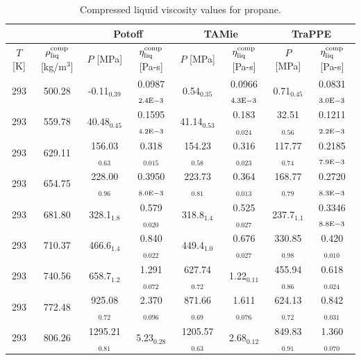 \documentclass[preprint,review,12pt]{elsarticle}
\begin{document}
	\begin{table}[H]
		\caption{Compressed liquid viscosity values for propane.}
		\begin{center}
			\begin{tabular}{|c|c|c|c|c|c|c|c|}
				\hline
				            &                  & \multicolumn{2}{c|}{Potoff}     & \multicolumn{2}{c|}{TAMie}      & \multicolumn{2}{c|}{TraPPE}    \\ \hline
				$T$ {[}K{]} & $\rho^{\rm comp}_{\rm liq}$ {[}kg/m$^3${]} & $P$ {[}MPa{]}    & $\eta^{\rm comp}_{\rm liq}$ {[}Pa-s{]} & $P$ {[}MPa{]}    & $\eta^{\rm comp}_{\rm liq}$ {[}Pa-s{]} & $P$ {[}MPa{]}   & $\eta^{\rm comp}_{\rm liq}$ {[}Pa-s{]} \\ \hline
				293         & 500.28           & -0.11$_{0.39}$   & 0.0987$_{2.4 \rm E-3}$ & 0.54$_{0.35}$    & 0.0966$_{4.3 \rm E-3}$ & 0.71$_{0.45}$   & 0.0831$_{3.0 \rm E-3}$ \\ \hline
				293         & 559.78           & 40.48$_{0.45}$   & 0.1595$_{4.2 \rm E-3}$ & 41.14$_{0.53}$   & 0.183$_{0.024}$   & 32.51$_{0.56}$  & 0.1211$_{2.2 \rm E-3}$ \\ \hline
				293         & 629.11           & 156.03$_{0.63}$  & 0.318$_{0.015}$   & 154.23$_{0.58}$  & 0.316$_{0.023}$   & 117.77$_{0.74}$ & 0.2185$_{7.9 \rm E-3}$ \\ \hline
				293         & 654.75           & 228.00$_{0.96}$  & 0.3950$_{8.0 \rm E-3}$ & 223.73$_{0.81}$  & 0.364$_{0.013}$   & 168.77$_{0.79}$ & 0.2720$_{8.3 \rm E-3}$ \\ \hline
			    293         & 681.80           & 328.1$_{1.8}$    & 0.579$_{0.020}$   & 318.8$_{1.4}$    & 0.525$_{0.027}$   & 237.7$_{1.1}$   & 0.3346$_{8.8 \rm E-3}$ \\ \hline
				293         & 710.37           & 466.6$_{1.4}$    & 0.840$_{0.022}$   & 449.4$_{1.0}$    & 0.676$_{0.027}$   & 330.85$_{0.98}$ & 0.420$_{0.010}$   \\ \hline
				293         & 740.56           & 658.7$_{1.2}$    & 1.291$_{0.072}$   & 627.74$_{0.72}$  & 1.22$_{0.11}$     & 455.94$_{0.86}$ & 0.618$_{0.024}$   \\ \hline
				293         & 772.48           & 925.08$_{0.72}$  & 2.370$_{0.096}$   & 871.66$_{0.69}$  & 1.611$_{0.076}$   & 624.13$_{0.72}$ & 0.842$_{0.031}$   \\ \hline
				293         & 806.26           & 1295.21$_{0.81}$ & 5.23$_{0.28}$     & 1205.57$_{0.63}$ & 2.68$_{0.12}$     & 849.83$_{0.91}$ & 1.360$_{0.070}$   \\ \hline
				\end{tabular}
		\end{center}
	\end{table}
\end{document}
